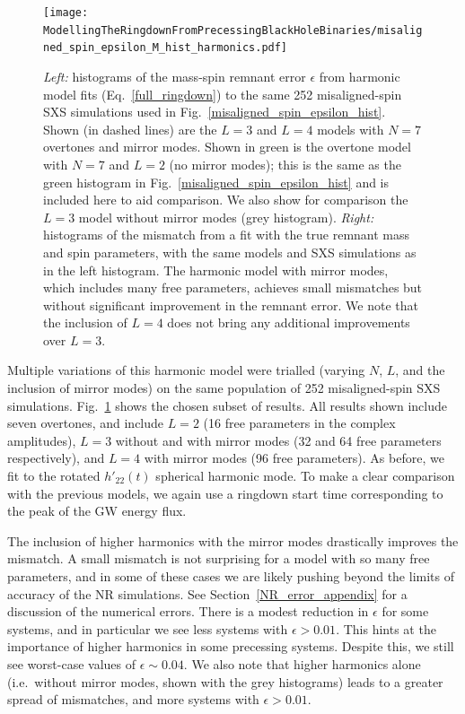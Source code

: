 \begin{figure}[t]
    \centering
    \texttt{[image: ModellingTheRingdownFromPrecessingBlackHoleBinaries/misaligned\_spin\_epsilon\_M\_hist\_harmonics.pdf]}
    \caption[Remnant-property errors and mismatches for the harmonic model fitted to misaligned-spin SXS simulations]{
    \emph{Left:} histograms of the mass-spin remnant error $\epsilon$ from harmonic model fits (Eq.~\ref{full_ringdown}) to the same 252 misaligned-spin SXS simulations used in Fig.~\ref{misaligned_spin_epsilon_hist}. 
    Shown (in dashed lines) are the $L=3$ and $L=4$ models with $N=7$ overtones and mirror modes. 
    Shown in green is the overtone model with $N=7$ and $L=2$ (no mirror modes); this is the same as the green histogram in Fig.~\ref{misaligned_spin_epsilon_hist} and is included here to aid comparison. 
    We also show for comparison the $L=3$ model without mirror modes (grey histogram).
    \emph{Right:} histograms of the mismatch from a fit with the true remnant mass and spin parameters, with the same models and SXS simulations as in the left histogram. 
    The harmonic model with mirror modes, which includes many free parameters, achieves small mismatches but without significant improvement in the remnant error. 
    We note that the inclusion of $L=4$ does not bring any additional improvements over $L=3$.
    }
    \label{misaligned_spin_epsilon_hist_harmonics}
\end{figure}

Multiple variations of this harmonic model were trialled (varying $N$, $L$, and the inclusion of mirror modes) on the same population of 252 misaligned-spin SXS simulations.
Fig.~\ref{misaligned_spin_epsilon_hist_harmonics} shows the chosen subset of results.
All results shown include seven overtones, and include $L=2$ (16 free parameters in the complex amplitudes), $L=3$ without and with mirror modes (32 and 64 free parameters respectively), and $L=4$ with mirror modes (96 free parameters).
As before, we fit to the rotated $h'_{22}(t)$ spherical harmonic mode.
To make a clear comparison with the previous models, we again use a ringdown start time corresponding to the peak of the GW energy flux.

The inclusion of higher harmonics with the mirror modes drastically improves the mismatch.
A small mismatch is not surprising for a model with so many free parameters, and in some of these cases we are likely pushing beyond the limits of accuracy of the NR simulations. See Section~\ref{NR_error_appendix} for a discussion of the numerical errors.
There is a modest reduction in $\epsilon$ for some systems, and in particular we see less systems with $\epsilon > 0.01$. This hints at the importance of higher harmonics in some precessing systems. Despite this, we still see worst-case values of $\epsilon \sim 0.04$.
We also note that higher harmonics alone (i.e.\ without mirror modes, shown with the grey histograms) leads to a greater spread of mismatches, and more systems with $\epsilon > 0.01$. 

